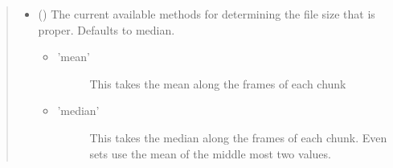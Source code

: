 \documentclass[letterpaper,10pt,english]{sphinxmanual}
\begin{document}
\begin{fulllineitems}
\begin{quote}
\begin{description}
\begin{itemize}
\item {} 
 (\sphinxstyleliteralemphasis{\sphinxupquote{ (}}\sphinxstyleliteralemphasis{\sphinxupquote{)}}) \textendash{} 
The current available methods for determining the file size
that is proper. Defaults to median.
\begin{itemize}
\item {} \begin{description}
\item[{’mean’}] \leavevmode
This takes the mean along the frames of each
chunk

\end{description}

\item {} \begin{description}
\item[{’median’}] \leavevmode
This takes the median along the frames of
each chunk. Even sets use the mean of the
middle most two values.

\end{description}

\end{itemize}


\end{itemize}

\end{description}\end{quote}

\end{fulllineitems}

\end{document}
